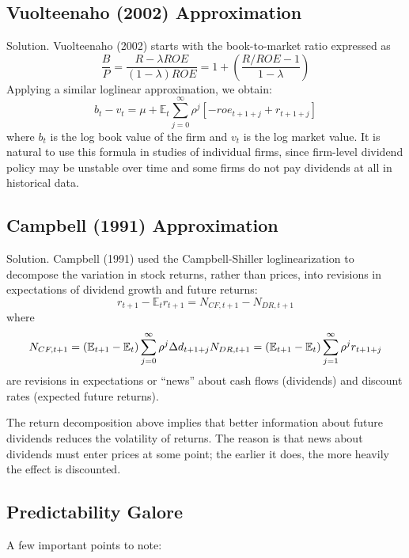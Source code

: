 \documentclass[
]{book}
\begin{document}
\hypertarget{vuolteenaho-2002-approximation}{%
\subsection{Vuolteenaho (2002) Approximation}\label{vuolteenaho-2002-approximation}}

Solution. Vuolteenaho (2002) starts with the book-to-market ratio expressed as
\[
\frac{B}{P}=\frac{R-\lambda ROE}{\left(1-\lambda\right)ROE}=1+\left(\frac{R/ROE-1}{1-\lambda}\right)
\]
Applying a similar loglinear approximation, we obtain:
\[
b_{t}-v_{t}=\mu+\mathbb{E}_{t}\sum_{j=0}^{\infty}\rho^{j}\left[-roe_{t+1+j}+r_{t+1+j}\right]
\]
where \(b_{t}\) is the log book value of the firm and \(v_{t}\) is the log market value. It is natural to use this formula in studies of individual firms, since firm-level dividend policy may be unstable over time and some firms do not pay dividends at all in historical data.

\hypertarget{campbell-1991-approximation}{%
\subsection{Campbell (1991) Approximation}\label{campbell-1991-approximation}}

Solution. Campbell (1991) used the Campbell-Shiller loglinearization to decompose the variation in stock returns, rather than prices, into revisions in expectations of dividend growth and future returns:
\[
r_{t+1}-\mathbb{E}_{t}r_{t+1}=N_{CF,t+1}-N_{DR,t+1}
\]
where
\[
N_{CF,t+1}=\left(\mathbb{E}_{t+1}-\mathbb{E}_{t}\right)\sum_{j=0}^{\infty}\rho^{j}\Delta d_{t+1+j}\\N_{DR,t+1}=\left(\mathbb{E}_{t+1}-\mathbb{E}_{t}\right)\sum_{j=1}^{\infty}\rho^{j}r_{t+1+j}
\]
are revisions in expectations or ``news'' about cash flows (dividends) and discount rates (expected future returns).

The return decomposition above implies that better information about future dividends reduces the volatility of returns. The reason is that news about dividends must enter prices at some point; the earlier it does, the more heavily the effect is discounted.

\hypertarget{predictability-galore}{%
\subsection{Predictability Galore}\label{predictability-galore}}

A few important points to note:
\end{document}
